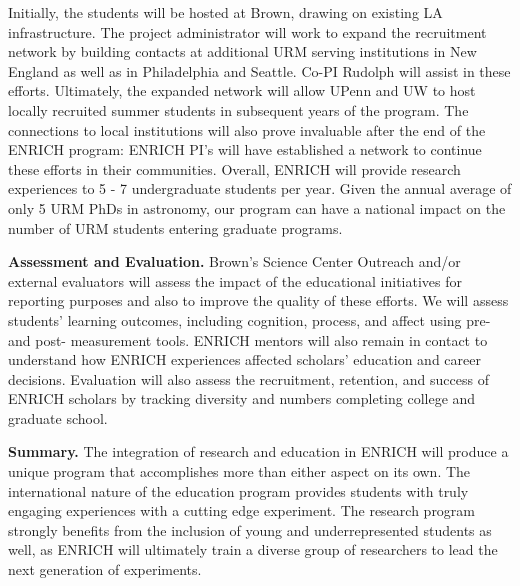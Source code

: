 \documentclass[preprint,11pt]{aastex}
\begin{document}
Initially, the students will be hosted at Brown, drawing on existing LA infrastructure.  
The project administrator will work to expand the recruitment network by building contacts at additional URM serving institutions in New England as well as in Philadelphia and Seattle.  Co-PI Rudolph will assist in these efforts.  Ultimately, the expanded network will allow UPenn and UW to host locally recruited summer students in subsequent years of the program.  The connections to local institutions will also prove invaluable after the end of the ENRICH program: 
ENRICH PI's will have established a network to continue these efforts in their communities.
Overall, ENRICH will provide research experiences to 5 - 7 undergraduate students per year. Given the 
annual average of only 5 URM PhDs 
in astronomy, our program can have a national impact on the number of 
URM students entering graduate programs.

\textbf{Assessment and Evaluation.} 
Brown's Science Center Outreach 
and/or external evaluators
will 
assess the impact of the educational initiatives for reporting purposes and also to improve the quality of these efforts. %
We will assess 
students' learning outcomes, including cognition, 
process,
and affect 
using pre- and post- measurement tools.
ENRICH mentors will also 
remain in contact
to understand how ENRICH experiences affected scholars' education and career decisions.
Evaluation will also assess the recruitment, retention, and success of ENRICH scholars by tracking 
diversity and numbers %
completing college and graduate school.  

\textbf{Summary.} The integration of research and education in ENRICH will produce a unique program that accomplishes more than either aspect on its own.  The international nature of the education program provides students with truly engaging experiences with a cutting edge experiment.  The research program strongly benefits from the inclusion of young and underrepresented students as well, as ENRICH will ultimately train a diverse group of researchers to lead the next generation of experiments.  

\clearpage
\setcounter{page}{1}
\thispagestyle{empty}


\end{document}
